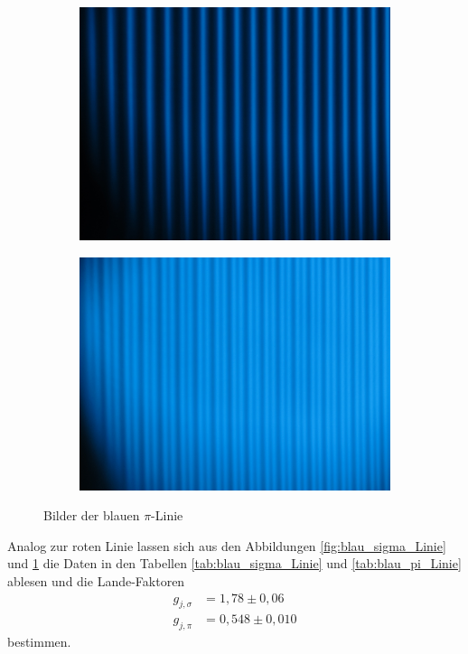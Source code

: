 \begin{figure}
  \centering
  \begin{subfigure}{0.4\textwidth}
    \centering
    \includegraphics[width=\textwidth]{Bilder/blau_pi_ohne_B.JPG}
  \end{subfigure}
  \begin{subfigure}{0.4\textwidth}
    \centering
    \includegraphics[width=\textwidth]{Bilder/blau_pi_mit_B.JPG}
  \end{subfigure}
  \caption{Bilder der blauen $\pi$-Linie}
  \label{fig:blau_pi_Linie}
\end{figure}
Analog zur roten Linie lassen sich aus den Abbildungen \ref{fig:blau_sigma_Linie} und \ref{fig:blau_pi_Linie} die Daten in den Tabellen \ref{tab:blau_sigma_Linie} und \ref{tab:blau_pi_Linie} ablesen
und die Lande-Faktoren
\begin{align}
  g_{j, \sigma} &= 1,78\pm 0,06\nonumber\\
  g_{j, \pi}    &= 0,548\pm 0,010
\end{align}
bestimmen.